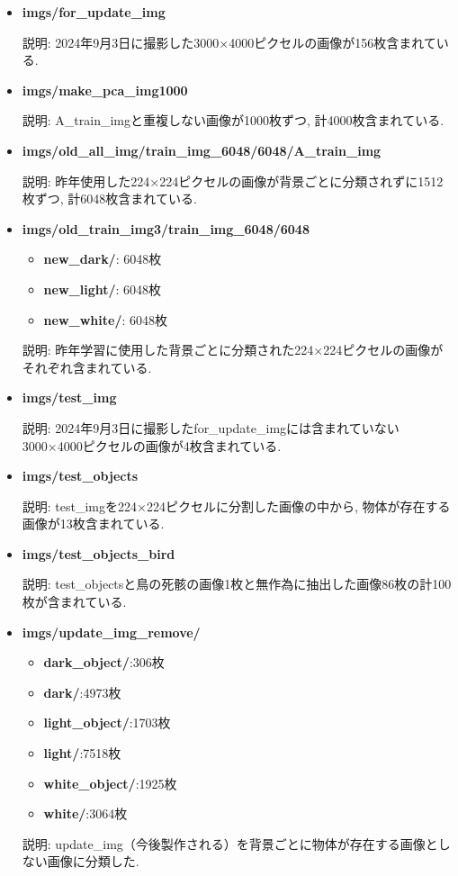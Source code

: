\documentclass[a4paper, 12pt]{report}
\begin{document}
\begin{itemize}
    \item \textbf{imgs/for\_update\_img}
        
    説明: 2024年9月3日に撮影した3000×4000ピクセルの画像が156枚含まれている. 

    \item \textbf{imgs/make\_pca\_img1000}

    説明: A\_train\_imgと重複しない画像が1000枚ずつ, 計4000枚含まれている. 

    \item \textbf{imgs/old\_all\_img/train\_img\_6048/6048/A\_train\_img}
    
    説明: 昨年使用した224×224ピクセルの画像が背景ごとに分類されずに1512枚ずつ, 計6048枚含まれている. 

    \item \textbf{imgs/old\_train\_img3/train\_img\_6048/6048}
    \begin{itemize}
        \item \textbf{new\_dark/}: 6048枚
        \item \textbf{new\_light/}: 6048枚
        \item \textbf{new\_white/}: 6048枚
    \end{itemize}

    説明: 昨年学習に使用した背景ごとに分類された224×224ピクセルの画像がそれぞれ含まれている. 
    \item \textbf{imgs/test\_img}
    
    説明: 2024年9月3日に撮影したfor\_update\_imgには含まれていない3000×4000ピクセルの画像が4枚含まれている. 

    \item \textbf{imgs/test\_objects}
    
    説明: test\_imgを224×224ピクセルに分割した画像の中から, 物体が存在する画像が13枚含まれている. 

    \item \textbf{imgs/test\_objects\_bird}
    
    説明: test\_objectsと鳥の死骸の画像1枚と無作為に抽出した画像86枚の計100枚が含まれている. 
   
    \item \textbf{imgs/update\_img\_remove/}
    \begin{itemize}
        \item \textbf{dark\_object/}:306枚
        \item \textbf{dark/}:4973枚
        \item \textbf{light\_object/}:1703枚
        \item \textbf{light/}:7518枚
        \item \textbf{white\_object/}:1925枚
        \item \textbf{white/}:3064枚
    \end{itemize}

    説明: update\_img（今後製作される）を背景ごとに物体が存在する画像としない画像に分類した. 
\end{itemize}
\end{document}
